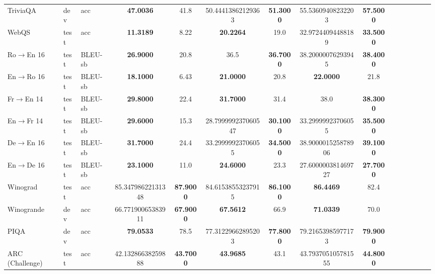\documentclass{article}
\theoremstyle{definition}
\begin{document}
\begin{table}
\begin{tabular}{lllSSSSSSSSSSSS}
    TriviaQA & dev & acc &
    \bfseries 47.0036 & 41.8 &
    50.44413862129363 & \bfseries 51.3000 &
    55.53609408232203 & \bfseries 57.5000 
    \\

    WebQS & test & acc &
    \bfseries 11.3189 & 8.22 &
    \bfseries 20.2264 & 19.0 &
    32.97244094488189 & \bfseries 33.5000 
    \\

    Ro$\to$En 16 & test & BLEU-sb &
    \bfseries 26.9000 & 20.8 &
    36.5 & \bfseries 36.7000 &
    38.20000076293945 & \bfseries 38.4000 
    \\

    En$\to$Ro 16 & test & BLEU-sb &
    \bfseries 18.1000 & 6.43 &
    \bfseries 21.0000 & 20.8 &
    \bfseries 22.0000 & 21.8 
    \\

    Fr$\to$En 14 & test & BLEU-sb &
    \bfseries 29.8000 & 22.4 &
    \bfseries 31.7000 & 31.4 &
    38.0 & \bfseries 38.3000 
    \\

    En$\to$Fr 14 & test & BLEU-sb &
    \bfseries 29.6000 & 15.3 &
    28.799999237060547 & \bfseries 30.1000 &
    33.29999923706055 & \bfseries 35.5000 
    \\

    De$\to$En 16 & test & BLEU-sb &
    \bfseries 31.7000 & 24.4 &
    33.29999923706055 & \bfseries 34.5000 &
    38.900001525878906 & \bfseries 39.1000 
    \\

    En$\to$De 16 & test & BLEU-sb &
    \bfseries 23.1000 & 11.0 &
    \bfseries 24.6000 & 23.3 &
    27.600000381469727 & \bfseries 27.7000 
    \\

    Winograd & test & acc &
    85.34798622131348 & \bfseries 87.9000 &
    84.61538553237915 & \bfseries 86.1000 &
    \bfseries 86.4469 & 82.4 
    \\

    Winogrande & dev & acc &
    66.77190065383911 & \bfseries 67.9000 &
    \bfseries 67.5612 & 66.9 &
    \bfseries 71.0339 & 70.0 
    \\

    PIQA & dev & acc &
    \bfseries 79.0533 & 78.5 &
    77.31229662895203 & \bfseries 77.8000 &
    79.21653985977173 & \bfseries 79.9000 
    \\

    ARC (Challenge) & test & acc &
    42.13286638259888 & \bfseries 43.7000 &
    \bfseries 43.9685 & 43.1 &
    43.793705105781555 & \bfseries 44.8000 
    \\


\end{tabular}
\end{table}
\end{document}
